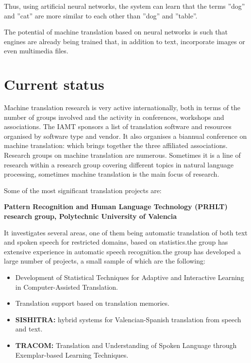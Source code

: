 \documentclass[a4paper]{article}
\theoremstyle{plain}
\theoremstyle{definition}
\begin{document}
	Thus, using artificial neural networks, the system can learn that the terms ''dog'' and ''cat'' are more similar to each other than ''dog'' and ''table''.\newline


    The potential of machine translation based on neural networks is such that engines are already being trained that, in addition to text, incorporate images or even multimedia files.
    
    
    
    

	\section{Current status}
	Machine translation research is very active internationally, both in terms of the number of groups involved and the activity in conferences, workshops and associations. The IAMT sponsors  a list of translation software and resources organised by software type and vendor. It also organises a biannual conference on machine translation: which brings together the three affiliated associations. Research groups on machine translation are numerous. Sometimes it is a line of research within a research group covering different topics in natural language processing, sometimes machine translation is the main focus of research.\newline
	
	Some of the most significant translation projects are:

   \begin{flushleft}
    \textbf{Pattern Recognition and Human Language Technology (PRHLT) research group, Polytechnic University of Valencia}
   \end{flushleft}
    It investigates several areas, one of them being automatic translation of both text and spoken speech for restricted domains, based on statistics.the group has extensive experience in automatic speech recognition.the group has developed a large number of projects, a small sample of which are the following:
     \begin{itemize}
         \item Development of Statistical Techniques for Adaptive and Interactive Learning in Computer-Assisted Translation.
         \item Translation support based on translation memories.
        \item \textbf{SISHITRA:} hybrid systems for Valencian-Spanish translation from speech and text.
        \item \textbf{TRACOM: }Translation and Understanding of Spoken Language through Exemplar-based Learning Techniques.
    \end{itemize}
   
\end{document}
